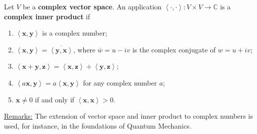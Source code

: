 \documentclass[20pt,a4paper]{extarticle}
\newcommand{\ra}{\rightarrow}
\newcounter{definition}
\begin{document}
\begin{definition}
Let $V$ be a \textbf{complex vector space}. An application $\left\langle \cdot , \cdot \right\rangle: V \times V \ra \mathbb{C}$ is a \textbf{complex inner product} if
	\begin{enumerate}[label=\Circled{P\arabic*}]
		\item $\left\langle \mathbf{x} , \mathbf{y} \right\rangle$ is a complex number;
		\item $\left\langle \mathbf{x} , \mathbf{y} \right\rangle = \overline{\left\langle \mathbf{y} , \mathbf{x} \right\rangle}$, where $\overline{w} = u - iv$ is the complex conjugate of $w = u + iv$;
		\item $\left\langle \mathbf{x} + \mathbf{y} , \mathbf{z} \right\rangle = \left\langle \mathbf{x} , \mathbf{z} \right\rangle + \left\langle \mathbf{y} , \mathbf{z} \right\rangle$;
		\item $\left\langle a \mathbf{x} , \mathbf{y} \right\rangle = a \left\langle \mathbf{x} , \mathbf{y} \right\rangle$ for any complex number $a$;
		\item $\mathbf{x} \neq 0$ if and only if $\left\langle \mathbf{x} , \mathbf{x} \right\rangle > 0$.
	\end{enumerate}
\end{definition}


\underline{Remarks:} The extension of vector space and inner product to complex numbers is used, for instance, in the foundations of Quantum Mechanics.
\end{document}
